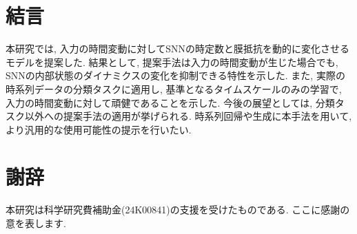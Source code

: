 \section{結言}

本研究では, 入力の時間変動に対してSNNの時定数と膜抵抗を動的に変化させるモデルを提案した.
結果として, 提案手法は入力の時間変動が生じた場合でも, SNNの内部状態のダイナミクスの変化を抑制できる特性を示した.
また, 実際の時系列データの分類タスクに適用し, 基準となるタイムスケールのみの学習で, 入力の時間変動に対して頑健であることを示した.
今後の展望としては, 分類タスク以外への提案手法の適用が挙げられる.
時系列回帰や生成に本手法を用いて, より汎用的な使用可能性の提示を行いたい.
% 
% 
% 
\section*{謝辞}
本研究は科学研究費補助金(24K00841)の支援を受けたものである. ここに感謝の意を表します.